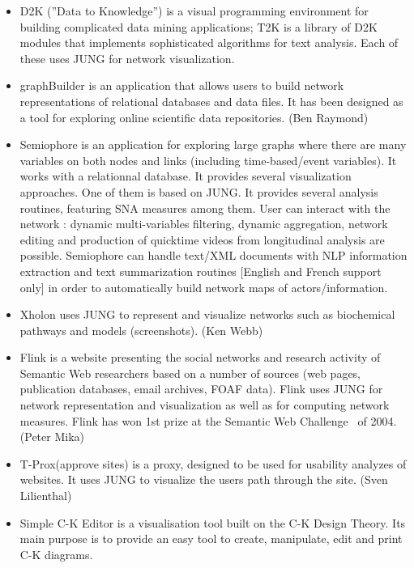 \begin{enumerate}
\begin{itemize}
\item D2K (''Data to Knowledge'') is a visual programming environment for building complicated data mining applications; T2K is a library of D2K modules that implements sophisticated algorithms for text analysis. Each of these uses JUNG for network visualization.~\cite{D2K}

\item graphBuilder is an application that allows users to build network representations of relational databases and data files. It has been designed as a tool for exploring online scientific data repositories. (Ben Raymond)~\cite{GRAPHBUILDER}

\item Semiophore is an application for exploring large graphs where there are many variables on both nodes and links (including time-based/event variables). It works with a relationnal database. It provides several visualization approaches. One of them is based on JUNG. It provides several analysis routines, featuring SNA measures among them. User can interact with the network : dynamic multi-variables filtering, dynamic aggregation, network editing and production of quicktime videos from longitudinal analysis are possible. Semiophore can handle text/XML documents with NLP information extraction and text summarization routines [English and French support only] in order to automatically build network maps of actors/information.~\cite{SEMIOPHORE}

\item Xholon uses JUNG to represent and visualize networks such as biochemical pathways and models (screenshots). (Ken Webb)~\cite{XHOLON}

\item Flink is a website presenting the social networks and research activity of Semantic Web researchers based on a number of sources (web pages, publication databases, email archives, FOAF data). Flink uses JUNG for network representation and visualization as well as for computing network measures. Flink has won 1st prize at the Semantic Web Challenge~\cite{SWC} of 2004. (Peter Mika)~\cite{FLINK}

\item T-Prox(approve sites) is a proxy, designed to be used for usability analyzes of websites. It uses JUNG to visualize the users path through the site. (Sven Lilienthal)~\cite{T_PROX}

\item Simple C-K Editor is a visualisation tool built on the C-K Design Theory. Its main purpose is to provide an easy tool to create, manipulate, edit and print C-K diagrams.~\cite{SIMPLE_C_K_EDITOR}


\end{itemize}
\end{enumerate}
